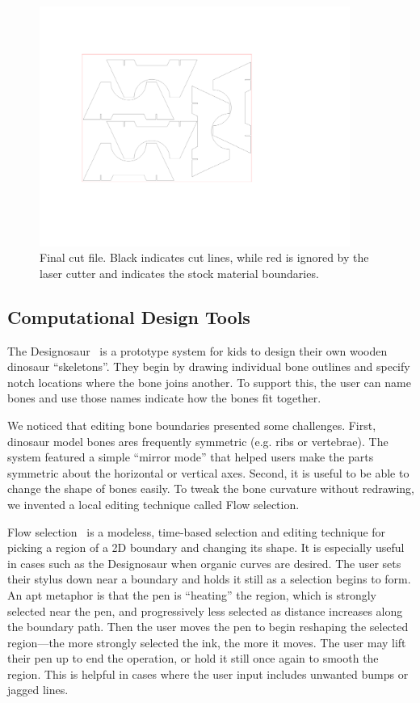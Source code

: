 \documentclass[12pt]{article}
\begin{document}
\begin{figure}[h] 
   \centering
   \includegraphics[width=4in]{img/participant-1-cutfile.pdf} 
   \caption{Final cut file. Black indicates cut lines, while red is
     ignored by the laser cutter and indicates the stock material
     boundaries.}
   \label{fig:cutfile}
\end{figure}

\subsection{Computational Design Tools}

The Designosaur~\cite{oh-fab} is a prototype system for kids to design
their own wooden dinosaur ``skeletons''. They begin by drawing
individual bone outlines and specify notch locations where the bone
joins another. To support this, the user can name bones and use those
names indicate how the bones fit together.

We noticed that editing bone boundaries presented some challenges.
First, dinosaur model bones ares frequently symmetric (e.g. ribs or
vertebrae). The system featured a simple ``mirror mode'' that helped
users make the parts symmetric about the horizontal or vertical axes.
Second, it is useful to be able to change the shape of bones
easily. To tweak the bone curvature without redrawing, we invented a
local editing technique called Flow selection.

Flow selection~\cite{johnson-flow-selection} is a modeless, time-based
selection and editing technique for picking a region of a 2D boundary
and changing its shape. It is especially useful in cases such as the
Designosaur when organic curves are desired. The user sets their
stylus down near a boundary and holds it still as a selection begins
to form. An apt metaphor is that the pen is ``heating'' the region,
which is strongly selected near the pen, and progressively less
selected as distance increases along the boundary path. Then the user
moves the pen to begin reshaping the selected region---the more
strongly selected the ink, the more it moves. The user may lift their
pen up to end the operation, or hold it still once again to smooth the
region. This is helpful in cases where the user input includes
unwanted bumps or jagged lines.
\end{document}
